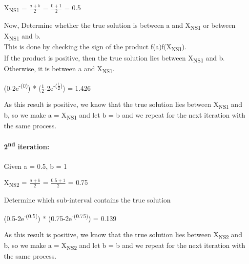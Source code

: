 \documentclass{report}
\begin{document}
                \begin{center}
                    X\textsubscript{NS1} = $\frac{a + b}{2}$ = $\frac{0 + 1}{2}$ = 0.5
                \end{center}

                Now, Determine whether the true solution is between a and X\textsubscript{NS1} or between X\textsubscript{NS1} and b.\\
                This is done by checking the sign of the product f(a)f(X\textsubscript{NS1}).\\
                If the product is positive, then the true solution lies between X\textsubscript{NS1} and b.\\
                Otherwise, it is between a and X\textsubscript{NS1}.\\

                \begin{center}
                    (0-2e\textsuperscript{-(0)}) * ($\frac{1}{2}$-2e\textsuperscript{-($\frac{1}{2}$)}) = 1.426
                \end{center}

                As this result is positive, we know that the true solution lies between X\textsubscript{NS1} and b,
                so we make a = X\textsubscript{NS1} and let b = b and we repeat for the next iteration with the same process.\\\\

                \textbf{2\textsuperscript{nd} iteration:}\\\\

                Given a = 0.5, b = 1

                \begin{center}
                    X\textsubscript{NS2} = $\frac{a + b}{2}$ = $\frac{0.5 + 1}{2}$ = 0.75
                \end{center}

                Determine which sub-interval contains the true solution

                \begin{center}
                    (0.5-2e\textsuperscript{-(0.5)}) * (0.75-2e\textsuperscript{-(0.75)}) = 0.139
                \end{center}

                As this result is positive, we know that the true solution lies between X\textsubscript{NS2} and b,
                so we make a = X\textsubscript{NS2} and let b = b and we repeat for the next iteration with the same process.\\\\
\end{document}
